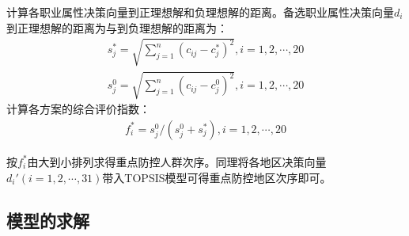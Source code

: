 \documentclass{whutmod}
\begin{document}
    计算各职业属性决策向量到正理想解和负理想解的距离。备选职业属性决策向量$d_{i}$到正理想解的距离为与到负理想解的距离为：
    \begin{gather*}
    s_{j}^{*}=\sqrt{\sum_{j=1}^{n}(c_{ij}-c_{j}^*)^{2}},i=1,2,\cdots,20\\
    s_{j}^{0}=\sqrt{\sum_{j=1}^{n}(c_{ij}-c_{j}^{0})^{2}},i=1,2,\cdots,20
    \end{gather*}
    计算各方案的综合评价指数：
    \begin{gather}
    f_{i}^{*}=s_{j}^{0}/(s_{j}^{0}+s_{j}^{*}),i=1,2,\cdots,20
    \end{gather}

    按$f_{i}^{*}$由大到小排列求得重点防控人群次序。同理将各地区决策向量$d_{i}'(i=1,2,\cdots,31)$带入TOPSIS模型可得重点防控地区次序即可。

    \subsection{模型的求解}
\end{document}
